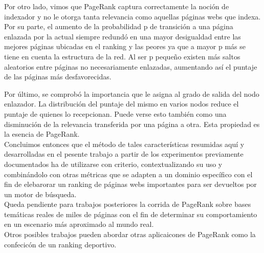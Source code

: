 Por otro lado, vimos que PageRank captura correctamente la noción de indexador y no le otorga tanta relevancia como aquellas páginas webs que indexa. \\
Por su parte, el aumento de la probabilidad p de transición a una página enlazada por la actual siempre redundó en una mayor desigualdad entre las mejores páginas ubicadas en el ranking y las peores ya que a mayor p más se tiene en cuenta la estructura de la red. Al ser p pequeño existen más saltos aleatorios entre páginas no necesariamente enlazadas, aumentando así el puntaje de las páginas más desfavorecidas.

Por último, se comprobó la importancia que le asigna al grado de salida del nodo enlazador. La distribución del puntaje del mismo en varios nodos reduce el puntaje de quienes lo recepcionan. Puede verse esto también como una disminución de la relevancia transferida por una página a otra. Esta propiedad es la esencia de PageRank. \\


Concluimos entonces que el método de tales características resumidas aquí y desarrolladas en el pesente trabajo a partir de los experimentos previamente documentados ha de utilizarse con criterio, contextualizando su uso y combinándolo con otras métricas que se adapten a un dominio específico con el fin de elebarorar un ranking de páginas webs importantes para ser devueltos por un motor de búsqueda.\\

Queda pendiente para trabajos posteriores la corrida de PageRank sobre bases temáticas reales de miles de páginas con el fin de determinar su comportamiento en un escenario más aproximado al mundo real. \\

Otros posibles trabajos pueden abordar otras aplicaicones de PageRank como la confecicón de un ranking deportivo. \\